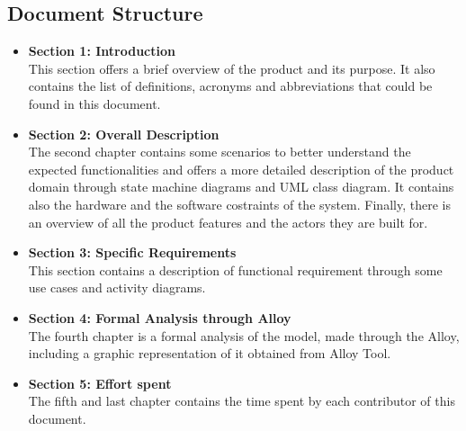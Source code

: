\subsection{Document Structure}
\begin{itemize}
    \item {\textbf{Section 1: Introduction}\\This section offers a brief overview of the product and its purpose. It also contains the list of definitions, acronyms and abbreviations that could be found in this document.}
    \item {\textbf{Section 2: Overall Description}\\The second chapter contains some scenarios to better understand the expected functionalities and offers a more detailed description of the product domain through state machine diagrams and UML class diagram. It contains also the hardware and the software costraints of the system. Finally, there is an overview of
     all the product features and the actors they are built for. }
    \item {\textbf{Section 3: Specific Requirements}\\This section contains a description of functional requirement through some use cases and activity diagrams.}
    \item {\textbf{Section 4: Formal Analysis through Alloy}\\The fourth chapter is a formal analysis of the model, made through the Alloy, including a graphic
    representation of it obtained from Alloy Tool.
    }
    \item {\textbf{Section 5: Effort spent}}\\The fifth and last chapter contains the time spent by each contributor of this document.

\end{itemize}
